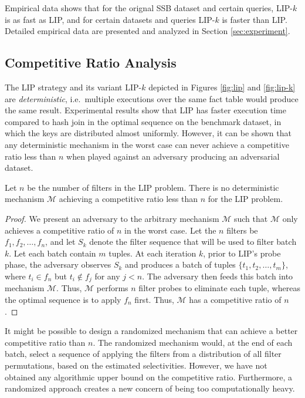 Empirical data shows that for the orignal SSB dataset and certain queries, LIP-$k$ is as fast as LIP, and for certain datasets and queries LIP-$k$ is faster than LIP. Detailed empirical data are presented and analyzed in Section \ref{sec:experiment}.



\subsection{Competitive Ratio Analysis}

The LIP strategy and its variant LIP-$k$ depicted in Figures \ref{fig:lip} and \ref{fig:lip-k} are \textit{deterministic}, i.e.\ multiple executions over the same fact table would produce the same result. Experimental results show that LIP has faster execution time compared to hash join in the optimal sequence \cite{zhu2017looking} on the benchmark dataset, in which the keys are distributed almost uniformly. However, it can be shown that any deterministic mechanism in the worst case can never achieve a competitive ratio less than $n$ when played against an adversary producing an adversarial dataset.


\begin{theorem}\label{thm:det-n}
	Let $n$ be the number of filters in the LIP problem. There is no deterministic mechanism $\mathcal{M}$ achieving a competitive ratio less than $n$ for the \textsc{LIP} problem.

\end{theorem}

\begin{proof}
	We present an adversary to the arbitrary mechanism $\mathcal{M}$ such that $\mathcal{M}$ only achieves a competitive ratio of $n$ in the worst case. 
	Let the $n$ filters be $f_1, f_2, \dots, f_n$, 
	and let $S_k$ denote the filter sequence that will be used to filter batch $k$. 
	Let each batch contain $m$ tuples.
	At each iteration $k$, prior to LIP's probe phase, the adversary observes $S_k$ and produces a batch of tuples $\{t_1, t_2, \dots, t_m\}$, where $t_i \in f_n$ but $t_i \notin f_j$ for any $j < n$. The adversary then feeds this batch into mechanism $\mathcal{M}$. Thus, $\mathcal{M}$ performs $n$ filter probes to eliminate each tuple, whereas the optimal sequence is to apply $f_n$ first. Thus, $\mathcal{M}$ has a competitive ratio of $n$.
\end{proof}

It might be possible to design a randomized mechanism that can achieve a better competitive ratio than $n$. The randomized mechanism would, at the end of each batch, select a sequence of applying the filters from a distribution of all filter permutations, based on the estimated selectivities. However, we have not obtained any algorithmic upper bound on the competitive ratio. Furthermore, a randomized approach creates a new concern of being too computationally heavy.

